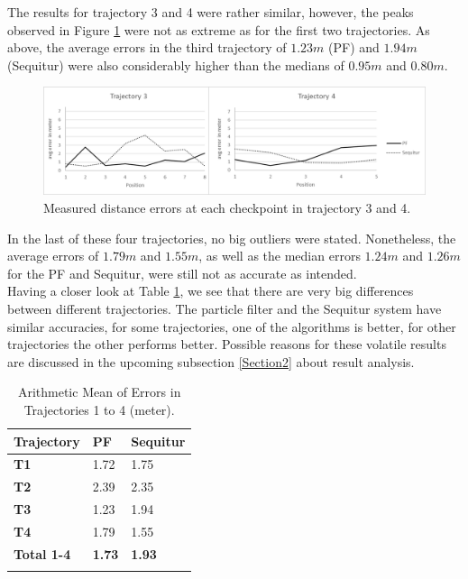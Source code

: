 The results for trajectory 3 and 4 were rather similar, however, the peaks observed in Figure \ref{fig:trajectory3and4_results} were not as extreme as for the first two trajectories. As above, the average errors in the third trajectory of $1.23m$ (PF) and $1.94m$ (Sequitur) were also considerably higher than the medians of $0.95m$ and $0.80m$.
\begin{figure}[th]
\centering
\includegraphics[width=1.0\textwidth]{Figures/trajectory3_4_results}
\decoRule
\caption[Localization Results of Trajectory 3 and 4]{Measured distance errors at each checkpoint in trajectory 3 and 4.}
\label{fig:trajectory3and4_results}
\end{figure}In the last of these four trajectories, no big outliers were stated. Nonetheless, the average errors of $1.79m$ and $1.55m$, as well as the median errors $1.24m$ and $1.26m$ for the PF and Sequitur, were still not as accurate as intended.\\
\noindent\hspace*{5mm}%
Having a closer look at Table \ref{tab:arithmetic_errors}, we see that there are very big differences between different trajectories. The particle filter and the Sequitur system have similar accuracies, for some trajectories, one of the algorithms is better, for other trajectories the other performs better. Possible reasons for these volatile results are discussed in the upcoming subsection  \ref{Section2} about result analysis. 

\begin{table}
\caption{Arithmetic Mean of Errors in Trajectories 1 to 4 (meter).}
\label{tab:arithmetic_errors}
\centering
\begin{tabular}{l l l}
\toprule
\textbf{Trajectory} & \textbf{PF} & \textbf{Sequitur}\\
\midrule
\textbf{T1} & 1.72 & 1.75\\
\textbf{T2} & 2.39 & 2.35\\
\textbf{T3} & 1.23 & 1.94\\
\textbf{T4} & 1.79 & 1.55\\
\midrule
\textbf{Total 1-4}  & \textbf{1.73} & \textbf{1.93}\\
\bottomrule\\
\end{tabular}
\end{table}

